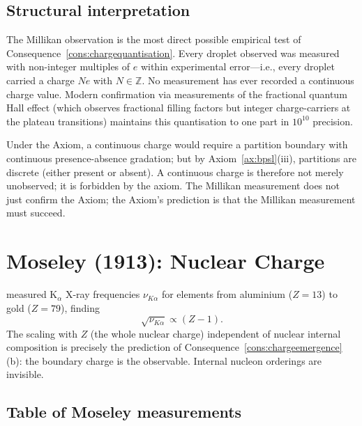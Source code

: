 \documentclass[11pt,twocolumn,a4paper]{article}
\theoremstyle{axiomstyle}
\theoremstyle{conseqstyle}
\theoremstyle{definition}
\theoremstyle{remark}
\newcommand{\Integer}{\mathbb{Z}}
\begin{document}
\subsection{Structural interpretation}

The Millikan observation is the most direct possible empirical test of Consequence~\ref{cons:chargequantisation}. Every droplet observed was measured with non-integer multiples of $e$ within experimental error---i.e., every droplet carried a charge $Ne$ with $N\in\Integer$. No measurement has ever recorded a continuous charge value. Modern confirmation via measurements of the fractional quantum Hall effect (which observes fractional filling factors but integer charge-carriers at the plateau transitions) maintains this quantisation to one part in $10^{10}$ precision.

Under the Axiom, a continuous charge would require a partition boundary with continuous presence-absence gradation; but by Axiom~\ref{ax:bpsl}(iii), partitions are discrete (either present or absent). A continuous charge is therefore not merely unobserved; it is forbidden by the axiom. The Millikan measurement does not just confirm the Axiom; the Axiom's prediction is that the Millikan measurement must succeed.

\section{Moseley (1913): Nuclear Charge}
\label{sec:moseley}

\citet{moseley1913} measured K$_{\alpha}$ X-ray frequencies $\nu_{K\alpha}$ for elements from aluminium ($Z=13$) to gold ($Z=79$), finding
\begin{equation*}
\sqrt{\nu_{K\alpha}}\propto(Z-1).
\end{equation*}
The scaling with $Z$ (the whole nuclear charge) independent of nuclear internal composition is precisely the prediction of Consequence~\ref{cons:chargeemergence}(b): the boundary charge is the observable. Internal nucleon orderings are invisible.

\subsection{Table of Moseley measurements}
\end{document}
